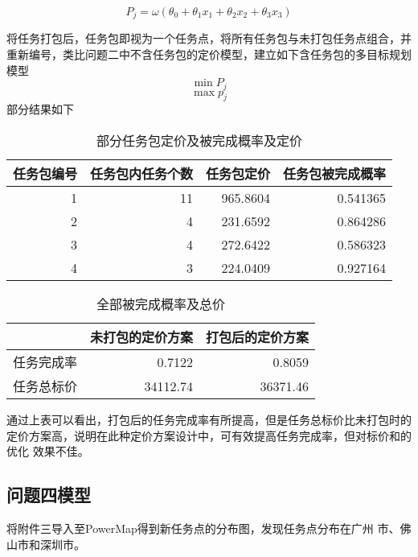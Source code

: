 \documentclass{cumcmthesis}
\begin{document}
\begin{equation}
\left.
P_j=\omega\left(\theta_0+\theta_1x_1+\theta_2x_2+\theta_3x_3\right)
\right.
\end{equation}

将任务打包后，任务包即视为一个任务点，将所有任务包与未打包任务点组合，并 重新编号，类比问题二中不含任务包的定价模型，建立如下含任务包的多目标规划模型
\[
\min P_j
\]
\[
\max p_j
\]
部分结果如下

\begin{table}[!htbp]
\centering
	\caption{ 部分任务包定价及被完成概率及定价}\label{Tab:7} 
\begin{tabular}{rrrr}
	\toprule[1.5pt]
	\multicolumn{1}{l}{任务包编号} & \multicolumn{1}{l}{ 任务包内任务个数 } & \multicolumn{1}{l}{任务包定价} & \multicolumn{1}{l}{ 任务包被完成概率 } \\
	\midrule[1pt]
	1     & 11    & 965.8604 & 0.541365 \\
	2     & 4     & 231.6592 & 0.864286 \\
	3     & 4     & 272.6422 & 0.586323 \\
	4     & 3     & 224.0409 & 0.927164 \\
		\bottomrule[1.5pt]
\end{tabular}%

\end{table}



\begin{table}[!htbp]
\centering
	\caption{ 全部被完成概率及总价}\label{Tab:8} 
    \begin{tabular}{lrr}
    \toprule[1.5pt]
	& \multicolumn{1}{l}{未打包的定价方案 } & \multicolumn{1}{l}{ 打包后的定价方案} \\
	\midrule[1pt]
	任务完成率  & 0.7122 & 0.8059 \\
	任务总标价  & 34112.74 & 36371.46 \\
		\bottomrule[1.5pt]
\end{tabular}%
\end{table}

通过上表可以看出，打包后的任务完成率有所提高，但是任务总标价比未打包时的 定价方案高，说明在此种定价方案设计中，可有效提高任务完成率，但对标价和的优化 效果不佳。

\subsection{问题四模型}

将附件三导入至PowerMap得到新任务点的分布图，发现任务点分布在广州 市、佛山市和深圳市。
\end{document}
